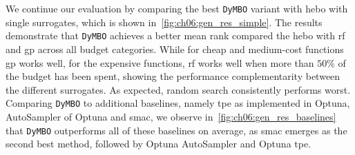 We continue our evaluation by comparing the best \texttt{DyMBO} variant with \gls{hebo} with single surrogates, which is shown in~\cref{fig:ch06:gen_res_simple}.
The results demonstrate that \texttt{DyMBO} achieves a better mean rank compared the \gls{hebo} with \gls{rf} and \gls{gp} across all budget categories. While for cheap and medium-cost functions \gls{gp} works well, for the expensive functions, \gls{rf} works well when more than $50\%$ of the budget has been spent, showing the performance complementarity between the different surrogates. As expected, random search consistently performs worst. Comparing \texttt{DyMBO} to additional baselines, namely \gls{tpe} as implemented in Optuna, AutoSampler of Optuna and \gls{smac}, we observe in~\cref{fig:ch06:gen_res_baselines} that \texttt{DyMBO} outperforms all of these baselines on average, as \gls{smac} emerges as the second best method, followed by Optuna AutoSampler and Optuna \gls{tpe}.

